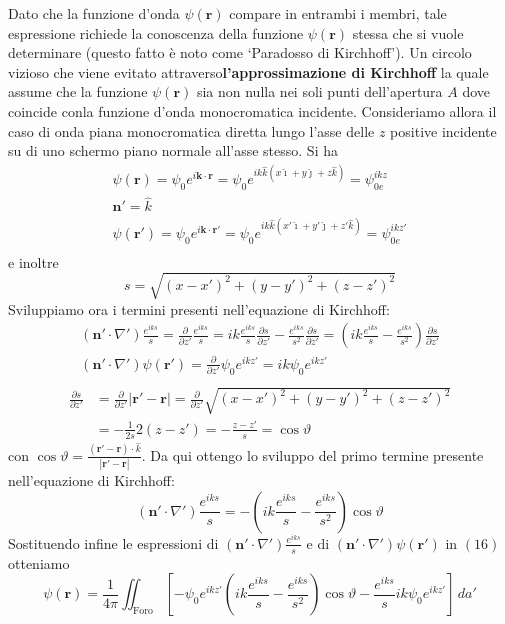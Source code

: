 Dato che la funzione d'onda \(\psi(\bm{r})\) compare in entrambi i
membri, tale espressione richiede la conoscenza della funzione
\(\psi(\bm{r})\) stessa che si vuole determinare (questo fatto è noto
come `Paradosso di Kirchhoff'). Un circolo vizioso che viene evitato
attraverso\textbf{l'approssimazione di Kirchhoff} la quale assume che la
funzione \(\psi(\bm{r})\) sia non nulla nei soli punti dell'apertura
\(A\) dove coincide conla funzione d'onda monocromatica incidente.
Consideriamo allora il caso di onda piana monocromatica diretta lungo
l'asse delle \(z\) positive incidente su di uno schermo piano normale
all'asse stesso. Si ha
\begin{gather*}
	\psi(\bm{r}) = \psi_0 e^{i \bm{k} \cdot \bm{r}}= \psi_0e^{ik \hat{k}(x \hat{\imath}+y \hat{\jmath}+z \hat{k})}= \psi_{0e}^{ikz}\\
	\bm{n}' = \hat{k}\\
	\psi(\bm{r'}) = \psi_0 e^{i \bm{k} \cdot \bm{r'}}= \psi_0e^{ik \hat{k}(x' \hat{\imath}+y' \hat{\jmath}+z' \hat{k})}= \psi_{0e}^{ikz'}\\
\end{gather*}
e inoltre
\[
	s = \sqrt{(x-x')^2+(y-y')^2+(z-z')^2}
\]
Sviluppiamo ora i termini presenti nell'equazione di Kirchhoff:
\begin{gather*}
	(\bm{n}' \cdot \nabla')\frac{e^{iks}}{s} = \frac{\partial}{\partial z'}\frac{e^{iks}}{s} = ik \frac{e^{iks}}{s}\frac{\partial s}{\partial z'} - \frac{e^{iks}}{s^2}\frac{\partial s}{\partial z'}  = \left( ik \frac{e^{iks}}{s}- \frac{e^{iks}}{s^2} \right)\frac{\partial s}{\partial z'}\\
	(\bm{n}' \cdot \nabla')\psi(\bm{r'}) = \frac{\partial}{\partial z'}\psi_0e^{ikz'}=ik\psi_0e^{ikz'}\\
\end{gather*}
\begin{align*}
	\frac{\partial s}{\partial z'} & = \frac{\partial }{\partial z'}|\bm{r'}-\bm{r}| = \frac{\partial }{\partial z'}\sqrt{(x-x')^2+(y-y')^2+(z-z')^2} \\
	                               & = - \frac{1}{2s}2(z-z') = - \frac{z-z'}{s} = \cos \vartheta
\end{align*}
con $\cos \vartheta = \frac{ (\bm{r'}-\bm{r})\cdot \hat{k}}{|\bm{r'}-\bm{r}|}$.
Da qui ottengo lo sviluppo del primo termine presente nell'equazione di Kirchhoff:
\[
	(\bm{n}' \cdot \nabla')\frac{e^{iks}}{s} = -\left(ik\frac{e^{iks}}{s}-\frac{e^{iks}}{s^2}\right) \cos \vartheta
\]
Sostituendo infine le espressioni di $(\bm{n}' \cdot \nabla ') \frac{e^{iks}}{s}$ e di $(\bm{n}' \cdot \nabla')\psi(\bm{r'})$ in $(16)$ otteniamo
\[
	\psi(\bm{r}) = \frac{1}{4 \pi} \iint_{\text{Foro}} \left[-\psi_0 e^{ikz'}\left( ik\frac{e^{iks}}{s}-\frac{e^{iks}}{s^2}\right) \cos \vartheta - \frac{e^{iks}}{s} ik\psi_0 e^{ikz'} \right] \, da'
\]


